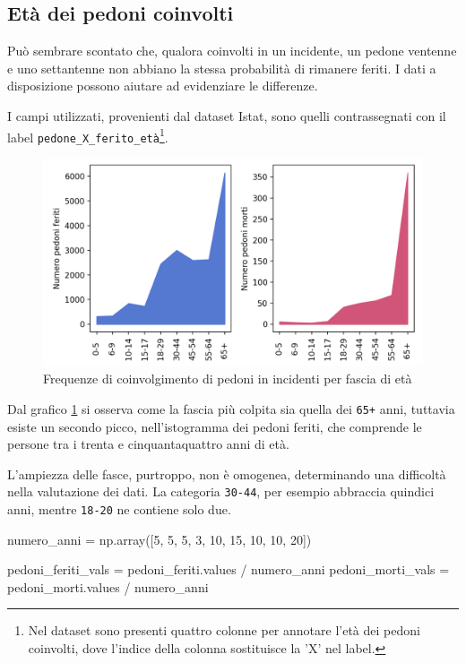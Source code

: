 \documentclass[a4paper,12pt]{report}
\newcommand{\columnstyle}[1]{\texttt{#1}}
\begin{document}
\subsection{Età dei pedoni coinvolti}

Può sembrare scontato che, qualora coinvolti in un incidente, un pedone ventenne e 
uno settantenne non abbiano la stessa probabilità di rimanere feriti. 
I dati a disposizione possono aiutare ad evidenziare le differenze.

I campi utilizzati, provenienti dal dataset Istat, sono quelli contrassegnati 
con il label 
\columnstyle{pedone\_X\_ferito\_età}\footnote{Nel dataset sono presenti quattro colonne per 
annotare l'età dei pedoni coinvolti, dove l'indice della colonna sostituisce la 'X' nel label.}. 

\begin{figure}
    \includegraphics[width=\linewidth]{../src/incidenti/incidenti_senza_coords/pedoni/eta_pedoni_iniziale.png}
    \caption{Frequenze di coinvolgimento di pedoni in incidenti per fascia di età}
    \label{fig:eta-pedoni-iniziale}
\end{figure}

Dal grafico \ref{fig:eta-pedoni-iniziale} si osserva come la fascia più colpita 
sia quella dei \columnstyle{65+} anni, tuttavia esiste un secondo picco, nell'istogramma 
dei pedoni feriti, che comprende le persone tra i trenta e cinquantaquattro anni di età. 

L'ampiezza delle fasce, purtroppo, non è omogenea, determinando una difficoltà 
nella valutazione dei dati.
La categoria 
\columnstyle{30-44}, per esempio abbraccia quindici anni, mentre 
\columnstyle{18-20} ne contiene solo due. 

\begin{code}[language=Python]
numero_anni = np.array([5, 5, 5, 3, 10, 15, 10, 10, 20])

pedoni_feriti_vals = pedoni_feriti.values / numero_anni
pedoni_morti_vals = pedoni_morti.values / numero_anni
\end{code}
\end{document}
